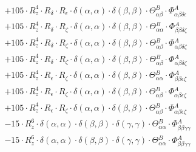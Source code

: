 \documentclass{article}
\begin{document}
\begin{subequations}
\begin{gather}
\begin{array}{c}
 \\[0.2em] 		 + 105 \cdot R_{z}^{4} \cdot R_{\delta{}} \cdot R_{\epsilon{}} \cdot \delta{}\left(\alpha{}, \alpha{}\right) \cdot \delta{}\left(\beta{}, \beta{}\right) \cdot \Theta{}^{B}_{\alpha{}\beta{}} \cdot \Phi{}^{A}_{\alpha{}\beta{}\delta{}\epsilon{}} 
 \\[0.2em] 		 + 105 \cdot R_{z}^{4} \cdot R_{\delta{}} \cdot R_{\zeta{}} \cdot \delta{}\left(\alpha{}, \alpha{}\right) \cdot \delta{}\left(\beta{}, \beta{}\right) \cdot \Theta{}^{B}_{\alpha{}\alpha{}} \cdot \Phi{}^{A}_{\beta{}\beta{}\delta{}\zeta{}} 
 \\[0.2em] 		 + 105 \cdot R_{z}^{4} \cdot R_{\delta{}} \cdot R_{\zeta{}} \cdot \delta{}\left(\alpha{}, \alpha{}\right) \cdot \delta{}\left(\beta{}, \beta{}\right) \cdot \Theta{}^{B}_{\alpha{}\beta{}} \cdot \Phi{}^{A}_{\alpha{}\beta{}\delta{}\zeta{}} 
 \\[0.2em] 		 + 105 \cdot R_{z}^{4} \cdot R_{\delta{}} \cdot R_{\zeta{}} \cdot \delta{}\left(\alpha{}, \alpha{}\right) \cdot \delta{}\left(\beta{}, \beta{}\right) \cdot \Theta{}^{B}_{\alpha{}\beta{}} \cdot \Phi{}^{A}_{\alpha{}\beta{}\delta{}\zeta{}} 
 \\[0.2em] 		 + 105 \cdot R_{z}^{4} \cdot R_{\epsilon{}} \cdot R_{\zeta{}} \cdot \delta{}\left(\alpha{}, \alpha{}\right) \cdot \delta{}\left(\beta{}, \beta{}\right) \cdot \Theta{}^{B}_{\alpha{}\alpha{}} \cdot \Phi{}^{A}_{\beta{}\beta{}\epsilon{}\zeta{}} 
 \\[0.2em] 		 + 105 \cdot R_{z}^{4} \cdot R_{\epsilon{}} \cdot R_{\zeta{}} \cdot \delta{}\left(\alpha{}, \alpha{}\right) \cdot \delta{}\left(\beta{}, \beta{}\right) \cdot \Theta{}^{B}_{\alpha{}\beta{}} \cdot \Phi{}^{A}_{\alpha{}\beta{}\epsilon{}\zeta{}} 
 \\[0.2em] 		 + 105 \cdot R_{z}^{4} \cdot R_{\epsilon{}} \cdot R_{\zeta{}} \cdot \delta{}\left(\alpha{}, \alpha{}\right) \cdot \delta{}\left(\beta{}, \beta{}\right) \cdot \Theta{}^{B}_{\alpha{}\beta{}} \cdot \Phi{}^{A}_{\alpha{}\beta{}\epsilon{}\zeta{}} 
 \\[0.2em] 		 - 15 \cdot R_{z}^{6} \cdot \delta{}\left(\alpha{}, \alpha{}\right) \cdot \delta{}\left(\beta{}, \beta{}\right) \cdot \delta{}\left(\gamma{}, \gamma{}\right) \cdot \Theta{}^{B}_{\alpha{}\alpha{}} \cdot \Phi{}^{A}_{\beta{}\beta{}\gamma{}\gamma{}} 
 \\[0.2em] 		 - 15 \cdot R_{z}^{6} \cdot \delta{}\left(\alpha{}, \alpha{}\right) \cdot \delta{}\left(\beta{}, \beta{}\right) \cdot \delta{}\left(\gamma{}, \gamma{}\right) \cdot \Theta{}^{B}_{\alpha{}\alpha{}} \cdot \Phi{}^{A}_{\beta{}\beta{}\gamma{}\gamma{}} 

\end{array}
\end{gather}
\end{subequations}
\end{document}
